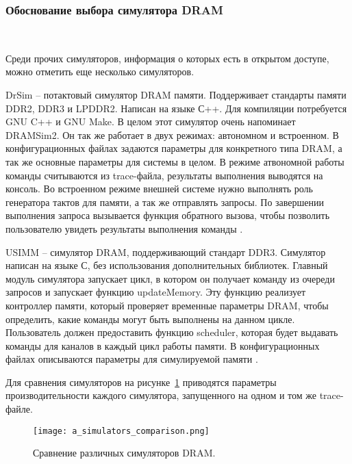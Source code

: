 \subsubsection{Обоснование выбора симулятора DRAM}~\\
\label{sub:domain:simulators:simulator_choice}

Среди прочих симуляторов, информация о которых есть в открытом доступе, можно отметить еще несколько симуляторов. 

DrSim – потактовый симулятор DRAM памяти. Поддерживает стандарты памяти DDR2, DDR3 и LPDDR2. Написан на языке С++. Для компиляции потребуется GNU C++ и GNU Make. В целом этот симулятор очень напоминает DRAMSim2. Он так же работает в двух режимах: автономном и встроенном. В конфигурационных файлах задаются параметры для конкретного типа DRAM, а так же основные параметры для системы в целом. В режиме атвономной работы команды считываются из trace-файла, результаты выполнения выводятся на консоль. Во встроенном режиме внешней системе нужно выполнять роль генератора тактов для памяти, а так же отправлять запросы. По завершении выполнения запроса вызывается функция обратного вызова, чтобы позволить пользователю увидеть результаты выполнения команды \cite{drsim_manual}.

USIMM – симулятор DRAM, поддерживающий стандарт DDR3. Симулятор написан на языке С, без использования дополнительных библиотек. Главный модуль симулятора запускает цикл, в котором он получает команду из очереди запросов и запускает функцию updateMemory. Эту функцию реализует контроллер памяти, который проверяет временные параметры DRAM, чтобы определить, какие команды могут быть выполнены на данном цикле. Пользователь должен предоставить функцию scheduler, которая будет выдавать команды для каналов в каждый цикл работы памяти. В конфигурационных файлах описываются параметры для симулируемой памяти \cite{usimm_manual}.
 

Для сравнения симуляторов на рисунке~\ref{fig:domain:simulators:simulator_choice:comparison} приводятся параметры производительности каждого симулятора, запущенного на одном и том же trace-файле.

\begin{figure}[ht]
\centering
  \texttt{[image: a\_simulators\_comparison.png]}  
  \caption{ Сравнение различных симуляторов DRAM. }
  \label{fig:domain:simulators:simulator_choice:comparison}
\end{figure}


